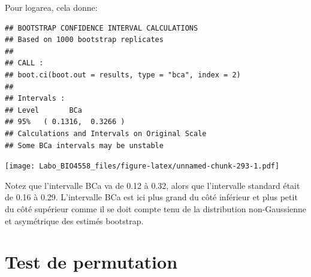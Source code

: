 \documentclass[12pt,]{book}
\newenvironment{Shaded}{\begin{snugshade}}{\end{snugshade}}
\newcommand{\CommentTok}[1]{\textcolor[rgb]{0.56,0.35,0.01}{\textit{#1}}}
\newcommand{\DataTypeTok}[1]{\textcolor[rgb]{0.13,0.29,0.53}{#1}}
\newcommand{\DecValTok}[1]{\textcolor[rgb]{0.00,0.00,0.81}{#1}}
\newcommand{\KeywordTok}[1]{\textcolor[rgb]{0.13,0.29,0.53}{\textbf{#1}}}
\newcommand{\NormalTok}[1]{#1}
\newcommand{\StringTok}[1]{\textcolor[rgb]{0.31,0.60,0.02}{#1}}
\begin{document}
\begin{Shaded}
\end{Shaded}

Pour logarea, cela donne:

\begin{verbatim}
## BOOTSTRAP CONFIDENCE INTERVAL CALCULATIONS
## Based on 1000 bootstrap replicates
## 
## CALL : 
## boot.ci(boot.out = results, type = "bca", index = 2)
## 
## Intervals : 
## Level       BCa          
## 95%   ( 0.1316,  0.3266 )  
## Calculations and Intervals on Original Scale
## Some BCa intervals may be unstable
\end{verbatim}

\texttt{[image: Labo\_BIO4558\_files/figure-latex/unnamed-chunk-293-1.pdf]}

Notez que l'intervalle BCa va de 0.12 à 0.32, alors que l'intervalle standard était de 0.16 à 0.29. L'intervalle BCa est ici plus grand du côté inférieur et plus petit du côté supérieur comme il se doit compte tenu de la distribution non-Gaussienne et asymétrique des estimés bootstrap.

\hypertarget{perm_reg_mult}{%
\section{Test de permutation}\label{perm_reg_mult}}
\end{document}
